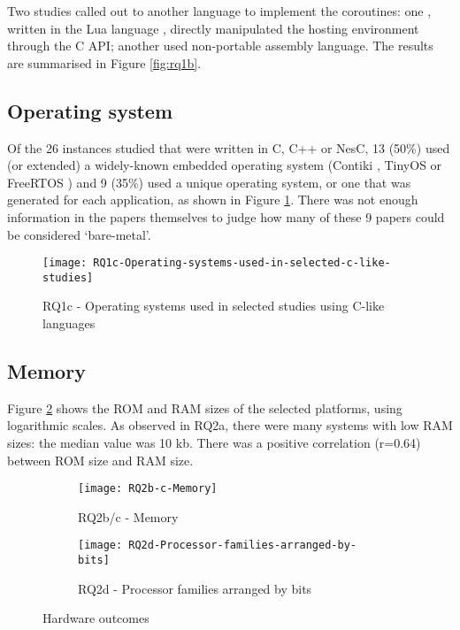 Two studies called out to another language to implement the coroutines: one \cite{Park2015}, written in the Lua language \cite{Moura2004a}, directly manipulated the hosting environment through the C API; another \cite{Khezri2008} used non-portable assembly language. The results are summarised in Figure \ref{fig:rq1b}.

\subsection{Operating system}

Of the 26 instances studied that were written in C, C++ or NesC, 13 (50\%) used (or extended) a widely-known embedded operating system (Contiki \cite{Dunkels2004}, TinyOS \cite{Levis2005} or FreeRTOS \cite{Barry2018}) and 9 (35\%) used a unique operating system, or one that was generated for each application, as shown in Figure \ref{fig:rq1c}. There was not enough information in the papers themselves to judge how many of these 9 papers could be considered ‘bare-metal’.

\begin{figure}[h]
	\texttt{[image: RQ1c-Operating-systems-used-in-selected-c-like-studies]}
	\caption{RQ1c - Operating systems used in selected studies using C-like languages}
	\label{fig:rq1c}
\end{figure}

\subsection{Memory}

Figure \ref{fig:rq2bc} shows the ROM and RAM sizes of the selected platforms, using logarithmic scales. As observed in RQ2a, there were many systems with low RAM sizes: the median value was 10 kb. There was a positive correlation (r=0.64) between ROM size and RAM size.

\begin{figure}[h]
	\centering
	\begin{subfigure}[h]{0.46\textwidth}
		\centering
		\texttt{[image: RQ2b-c-Memory]}
		\caption{RQ2b/c - Memory}
		\label{fig:rq2bc}
	\end{subfigure}
	\begin{subfigure}[h]{0.46\textwidth}
		\centering
		\texttt{[image: RQ2d-Processor-families-arranged-by-bits]}
		\caption{RQ2d - Processor families arranged by bits}
		\label{fig:rq2d}
	\end{subfigure}
	\caption{Hardware outcomes}
\end{figure}


